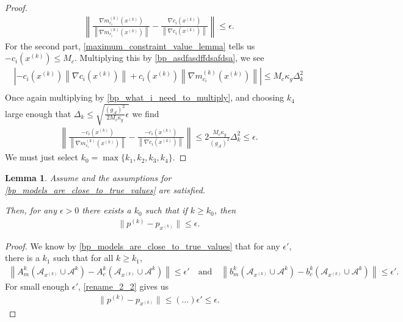 \documentclass{article}
\newtheorem{lemma}[theorem]{Lemma}
\theoremstyle{case}
\numberwithin{theorem}{subsection}
\newcommand{\dk}{\Delta_k}
\newcommand{\gmcik}{{\nabla m_{c_i}^{(k)}\left(\xk\right)}}
\newcommand{\minactivegrad}{{ g_{\mathcal A} }}
\newcommand{\xk}{x^{(k)}}
\begin{document}
\begin{proof}
\begin{align*}
\left\|\frac{\gmcik}{\left\|\gmcik\right\|} - \frac{\nabla c_i\left(\xk\right)}{\left\|\nabla c_i\left(\xk \right)\right\|} \right\| \le \epsilon.
\end{align*}
For the second part, 
\cref{maximum_constraint_value_lemma} tells us
$-c_i\left(\xk\right) \le M_c$.
Multiplying this by \cref{bp_asdfasdffdsafdsa}, we see
\begin{align*}
\left|-c_i\left(\xk\right)\left\|\nabla c_i\left(\xk \right)\right\| + c_i\left(\xk\right)\left\|\gmcik\right\|\right| \le M_c \kappa_g \dk^2 \\
\end{align*}
Once again multiplying by \cref{bp_what_i_need_to_multiply}, and choosing $k_4$ large enough that 
$\dk \le \sqrt{\frac{\left(\minactivegrad\right)^2}{2M_c \kappa_g} \epsilon}$
we find
\begin{align*}
\left\|\frac{-c_i\left(\xk \right)}{\left\|\gmcik\right\|} - \frac{-c_i\left(\xk \right)}{\left\|\nabla c_i\left(\xk \right)\right\|} \right\|
\le 2\frac{M_c \kappa_g}{\left(\minactivegrad\right)^2} \dk^2
\le \epsilon.
\end{align*}
We must just select $k_0 = \max\{k_1, k_2, k_3, k_4\}$.
\end{proof}


\begin{lemma}
\label{bp_first_application_of_2_2}
Assume 
and the assumptions for
\cref{bp_models_are_close_to_true_values}
are satisfied.

Then, for any $\epsilon > 0$ there exists a $k_0$ such that if $k \ge k_0$, then
\begin{align*}
\| p^{(k)} - p_{\xk} \| \le \epsilon.
\end{align*}
\end{lemma}
\begin{proof}
We know by \cref{bp_models_are_close_to_true_values} that for any $\epsilon'$, there is a $k_1$ such that for all $k \ge k_1$,
\begin{align*}
\left\|A^k_m\left(\mathcal A_{\xk} \cup \mathcal A^{k}\right) - A^k_c\left(\mathcal A_{\xk} \cup \mathcal A^{k}\right)\right\| \le \epsilon'
\quad \textrm{and} \quad \left\|b^k_m\left(\mathcal A_{\xk} \cup \mathcal A^{k}\right) - b^k_c\left(\mathcal A_{\xk} \cup \mathcal A^{k}\right)\right\| \le \epsilon'.
\end{align*}
For small enough $\epsilon'$, \cref{rename_2_2} gives us
\begin{align*}
\| p^{(k)} - p_{\xk} \| \le \left(\ldots\right) \epsilon' \le \epsilon.
\end{align*}
\end{proof}
\end{document}
